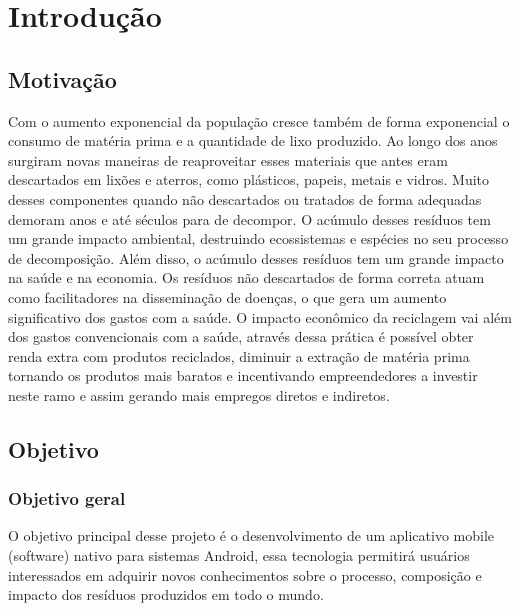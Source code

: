 \documentclass[
	12pt,				%
	openright,			%
	twoside,			%
	a4paper,			%
	english,			%
	french,				%
	spanish,			%
	brazil				%
	]{abntex2}
\begin{document}
\tableofcontents*
\cleardoublepage




\textual





\chapter{Introdução}
\section{Motivação}
Com o aumento exponencial da população cresce também de forma exponencial o consumo de matéria prima e a quantidade de lixo produzido. Ao longo dos anos surgiram novas maneiras de reaproveitar esses materiais que antes eram descartados em lixões e aterros, como plásticos, papeis, metais e vidros. Muito desses componentes quando não descartados ou tratados de forma adequadas demoram anos e até séculos para de decompor. O acúmulo desses resíduos tem um grande impacto ambiental, destruindo ecossistemas e espécies no seu processo de decomposição. Além disso, o acúmulo desses resíduos tem um grande impacto na saúde e na economia. Os resíduos não descartados de forma correta atuam como facilitadores na disseminação de doenças, o que gera um aumento significativo dos gastos com a saúde. O impacto econômico da reciclagem vai além dos gastos convencionais com a saúde, através dessa prática é possível obter renda extra com produtos reciclados, diminuir a extração de matéria prima tornando os produtos mais baratos e incentivando empreendedores a investir neste ramo e assim gerando mais empregos diretos e indiretos. 
\section{Objetivo}
\subsection{Objetivo geral}
O objetivo principal desse projeto é o desenvolvimento de um aplicativo mobile (software) nativo para sistemas Android, essa tecnologia permitirá usuários interessados em adquirir novos conhecimentos sobre o processo, composição e impacto dos resíduos produzidos em todo o mundo.
\end{document}
